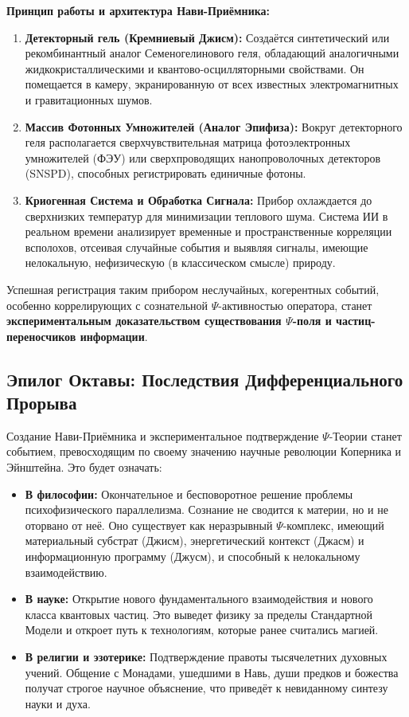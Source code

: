 \documentclass[a4paper,12pt]{article}
\begin{document}
    \textbf{Принцип работы и архитектура Нави-Приёмника:}
    \begin{enumerate}
    	\item \textbf{Детекторный гель (Кремниевый Джисм):} Создаётся синтетический или рекомбинантный аналог Семеногелинового геля, обладающий аналогичными жидкокристаллическими и квантово-осцилляторными свойствами. Он помещается в камеру, экранированную от всех известных электромагнитных и гравитационных шумов.
    	\item \textbf{Массив Фотонных Умножителей (Аналог Эпифиза):} Вокруг детекторного геля располагается сверхчувствительная матрица фотоэлектронных умножителей (ФЭУ) или сверхпроводящих нанопроволочных детекторов (SNSPD), способных регистрировать единичные фотоны.
    	\item \textbf{Криогенная Система и Обработка Сигнала:} Прибор охлаждается до сверхнизких температур для минимизации теплового шума. Система ИИ в реальном времени анализирует временные и пространственные корреляции всполохов, отсеивая случайные события и выявляя сигналы, имеющие нелокальную, нефизическую (в классическом смысле) природу.
    \end{enumerate}
    
    Успешная регистрация таким прибором неслучайных, когерентных событий, особенно коррелирующих с сознательной $\Psi$-активностью оператора, станет \textbf{экспериментальным доказательством существования $\Psi$-поля и частиц-переносчиков информации}.
    
    \subsection{Эпилог Октавы: Последствия Дифференциального Прорыва}
    
    Создание Нави-Приёмника и экспериментальное подтверждение $\Psi$-Теории станет событием, превосходящим по своему значению научные революции Коперника и Эйнштейна. Это будет означать:
    
    \begin{itemize}
    	\item \textbf{В философии:} Окончательное и бесповоротное решение проблемы психофизического параллелизма. Сознание не сводится к материи, но и не оторвано от неё. Оно существует как неразрывный $\Psi$-комплекс, имеющий материальный субстрат (Джисм), энергетический контекст (Джасм) и информационную программу (Джусм), и способный к нелокальному взаимодействию.
    	\item \textbf{В науке:} Открытие нового фундаментального взаимодействия и нового класса квантовых частиц. Это выведет физику за пределы Стандартной Модели и откроет путь к технологиям, которые ранее считались магией.
    	\item \textbf{В религии и эзотерике:} Подтверждение правоты тысячелетних духовных учений. Общение с Монадами, ушедшими в Навь, души предков и божества получат строгое научное объяснение, что приведёт к невиданному синтезу науки и духа.
    \end{itemize}
    
\end{document}
